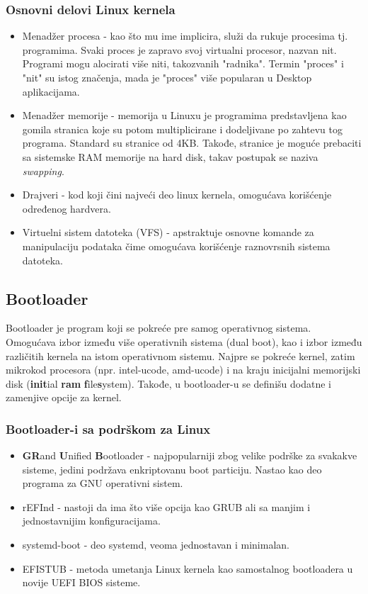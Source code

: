 \documentclass[a4paper,14pt]{article}
\begin{document}
\subsubsection{Osnovni delovi Linux kernela\cite{devibm}}
\begin{itemize}
\item Menadžer procesa - kao što mu ime implicira, služi da rukuje procesima tj. programima. Svaki proces je zapravo svoj virtualni procesor, nazvan nit. Programi mogu alocirati više niti, takozvanih "radnika". Termin "proces" i "nit" su istog značenja, mada je "proces" više popularan u Desktop aplikacijama.
\item Menadžer memorije - memorija u Linuxu je programima predstavljena kao gomila stranica koje su potom multiplicirane i dodeljivane po zahtevu tog programa. Standard su stranice od 4KB. Takođe, stranice je moguće prebaciti sa sistemske RAM memorije na hard disk, takav postupak se naziva \textit{swapping}.
\item Drajveri - kod koji čini najveći deo linux kernela, omogućava korišćenje određenog hardvera.
\item Virtuelni sistem datoteka (VFS) - apstraktuje osnovne komande za manipulaciju podataka čime omogućava korišćenje raznovrsnih sistema datoteka.
\end{itemize}
\newpage

\subsection{Bootloader}
Bootloader je program koji se pokreće pre samog operativnog sistema. Omogućava izbor između više operativnih sistema (dual boot), kao i izbor između različitih kernela na istom operativnom sistemu. Najpre se pokreće kernel, zatim mikrokod procesora (npr. intel-ucode, amd-ucode) i na kraju inicijalni memorijski disk (\textbf{init}ial \textbf{ram} \textbf{f}ile\textbf{s}ystem). Takođe, u bootloader-u se definišu dodatne i zamenjive opcije za kernel.
\subsubsection{Bootloader-i sa podrškom za Linux}
\begin{itemize}
\item \textbf{GR}and \textbf{U}nified \textbf{B}ootloader - najpopularniji zbog velike podrške za svakakve sisteme, jedini podržava enkriptovanu boot particiju. Nastao kao deo programa za GNU operativni sistem.
\item rEFInd - nastoji da ima što više opcija kao GRUB ali sa manjim i jednostavnijim konfiguracijama.
\item systemd-boot - deo systemd, veoma jednostavan i minimalan.
\item EFISTUB - metoda umetanja Linux kernela kao samostalnog bootloadera u novije UEFI BIOS sisteme.
\end{itemize}
\end{document}
